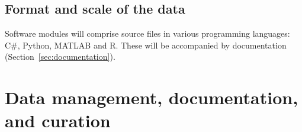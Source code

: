 \documentclass[a4paper,11pt]{article}
\renewcommand{\footnote}[1]{ [#1]}
\begin{document}

\subsection{Format and scale of the data}


Software modules will comprise source files in various programming languages:
C\#, Python, MATLAB and R.  These will be accompanied by documentation
(Section~\ref{sec:documentation}).





\section{Data management, documentation, and curation}

\end{document}
